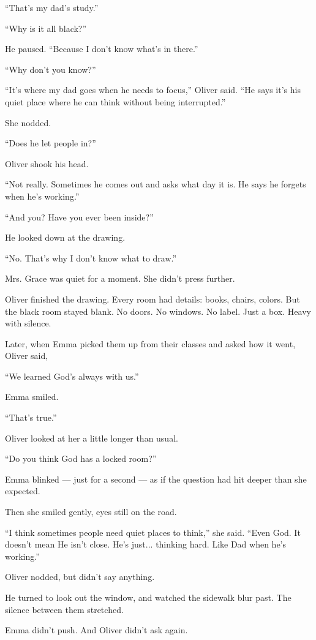 ``That’s my dad’s study.''

``Why is it all black?''

He paused. ``Because I don’t know what’s in there.''

``Why don’t you know?''

``It’s where my dad goes when he needs to focus,'' Oliver said. ``He says it’s his quiet place where 
he can think without being interrupted.''

She nodded.

``Does he let people in?''

Oliver shook his head.

``Not really. Sometimes he comes out and asks what day it is. He says he forgets when he’s working.''

``And you? Have you ever been inside?''

He looked down at the drawing.

``No. That's why I don't know what to draw.''

Mrs. Grace was quiet for a moment.  She didn’t press further.

Oliver finished the drawing. Every room had details: books, chairs, colors. But the black room stayed blank.  
No doors. No windows. No label. Just a box.  
Heavy with silence.

Later, when Emma picked them up from their classes and asked how it went, Oliver said,

``We learned God’s always with us.''

Emma smiled.

``That’s true.''

Oliver looked at her a little longer than usual.

``Do you think God has a locked room?''

Emma blinked --- just for a second --- as if the question had hit deeper than she expected.

Then she smiled gently, eyes still on the road.

``I think sometimes people need quiet places to think,'' she said. ``Even God. It doesn’t mean 
He isn’t close. He's just... thinking hard. Like Dad when he’s working.''

Oliver nodded, but didn’t say anything.

He turned to look out the window, and watched the sidewalk blur past.  
The silence between them stretched.

Emma didn’t push.  And Oliver didn’t ask again.


